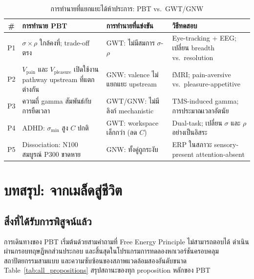 \documentclass[12pt,a4paper]{article}
\newcommand{\vpain}{V_{\mathrm{pain}}}
\newcommand{\vpleasure}{V_{\mathrm{pleasure}}}
\begin{document}
\begin{table}[!htbp]
\centering
\caption{การทำนายที่แยกแยะได้ห้าประการ: PBT vs.\ GWT/GNW}
\label{tab:discrim}
\small
\begin{tabular}{@{}cL{3.0cm}L{3.0cm}L{4.5cm}@{}}
\toprule
\textbf{\#} & \textbf{การทำนาย PBT}
  & \textbf{การทำนายที่แข่งขัน} & \textbf{วิธีทดสอบ} \\
\midrule
P1 & $\sigma\!\times\!\rho$ ใกล้คงที่; trade-off ตรง &
  GWT: ไม่มีสมการ $\sigma$-$\rho$ &
  Eye-tracking + EEG; เปลี่ยน breadth vs.\ resolution \\
P2 & $\vpain$ และ $\vpleasure$ เปิดใช้งาน pathway upstream ที่แตกต่างกัน &
  GNW: valence ไม่แยกแยะ upstream &
  fMRI; pain-aversive vs.\ pleasure-appetitive \\
P3 & ความถี่ gamma สัมพันธ์กับการยืดเวลา &
  GWT/GNW: ไม่มีลิงก์ mechanistic &
  TMS-induced gamma; การประมาณเวลาอัตนัย \\
P4 & ADHD: $\sigma_{\min}$ สูง $C$ ปกติ &
  GWT: workspace เล็กกว่า (ลด $C$) &
  Dual-task; เปลี่ยน $\sigma$ และ $\rho$ อย่างเป็นอิสระ \\
P5 & Dissociation: N100 สมบูรณ์ P300 ขาดหาย &
  GNW: ทั้งคู่ถูกระงับ &
  ERP ในสภาวะ sensory-present attention-absent \\
\bottomrule
\end{tabular}
\end{table}


\FloatBarrier
\section{บทสรุป: จากเมล็ดสู่ชีวิต}
\label{sec:conclusion}

\subsection{สิ่งที่ได้รับการพิสูจน์แล้ว}

การเดินทางของ PBT เริ่มต้นด้วยสามคำถามที่ Free Energy Principle
ไม่สามารถตอบได้ ดำเนินผ่านกรอบทฤษฎีหกส่วนประกอบ
และสิ้นสุดในโปรแกรมการทดลองหกเวอร์ชันครอบคลุมสถาปัตยกรรมสามแบบ
และความซับซ้อนของสภาพแวดล้อมสองอันดับขนาด
Table~\ref{tab:all_propositions} สรุปสถานะของทุก proposition หลักของ PBT
\end{document}

